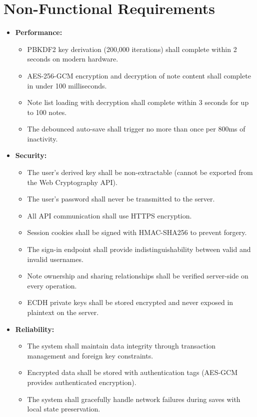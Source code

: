 \section{Non-Functional Requirements}

\begin{itemize}
    \item \textbf{Performance:}
    \begin{itemize}
        \item PBKDF2 key derivation (200,000 iterations) shall complete within 2 seconds on modern hardware.
        \item AES-256-GCM encryption and decryption of note content shall complete in under 100 milliseconds.
        \item Note list loading with decryption shall complete within 3 seconds for up to 100 notes.
        \item The debounced auto-save shall trigger no more than once per 800ms of inactivity.
    \end{itemize}

    \item \textbf{Security:}
    \begin{itemize}
        \item The user's derived key shall be non-extractable (cannot be exported from the Web Cryptography API).
        \item The user's password shall never be transmitted to the server.
        \item All API communication shall use HTTPS encryption.
        \item Session cookies shall be signed with HMAC-SHA256 to prevent forgery.
        \item The sign-in endpoint shall provide indistinguishability between valid and invalid usernames.
        \item Note ownership and sharing relationships shall be verified server-side on every operation.
        \item ECDH private keys shall be stored encrypted and never exposed in plaintext on the server.
    \end{itemize}

    \item \textbf{Reliability:}
    \begin{itemize}
        \item The system shall maintain data integrity through transaction management and foreign key constraints.
        \item Encrypted data shall be stored with authentication tags (AES-GCM provides authenticated encryption).
        \item The system shall gracefully handle network failures during saves with local state preservation.
    \end{itemize}


\end{itemize}
